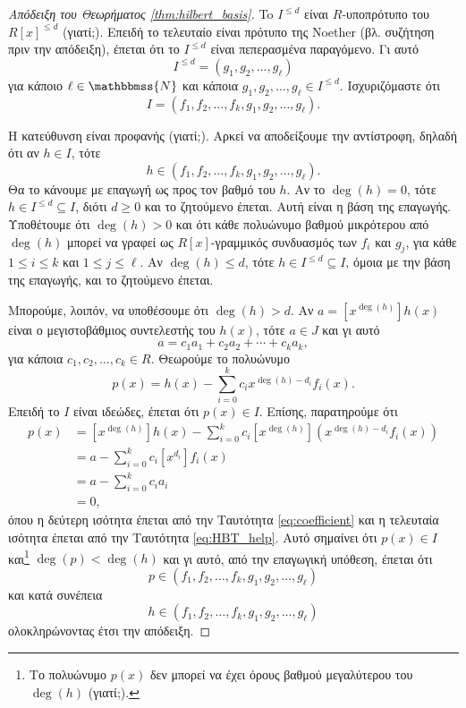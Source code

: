 \documentclass[12pt,a4paper,reqno]{amsart}
\theoremstyle{definition}
\theoremstyle{remark}
\numberwithin{theorem}{section}
\numberwithin{exercise}{section}
\numberwithin{equation}{section}
\newcommand{\NN}{\mathbbmss{N}}
\begin{document}
\begin{proof}[Απόδειξη του Θεωρήματος \ref{thm:hilbert_basis}]
    To $I^{\le d}$ είναι $R$-υποπρότυπο του $R[x]^{\le d}$ (γιατί;). Επειδή το τελευταίο είναι πρότυπο της Noether (βλ. συζήτηση πριν την απόδειξη), έπεται ότι το $I^{\le d}$ είναι πεπερασμένα παραγόμενο. Γι αυτό
    \[
    I^{\le d} = (g_1, g_2, \dots, g_\ell)
    \]
    για κάποιο $\ell \in \NN$ και κάποια $g_1, g_2, \dots, g_\ell \in I^{\le d}$. Ισχυριζόμαστε ότι 
    \[
    I = (f_1, f_2, \dots, f_k, g_1, g_2, \dots, g_\ell).
    \]

    Η κατεύθυνση \textquote{$\supseteq$} είναι προφανής (γιατί;). Αρκεί να αποδείξουμε την αντίστροφη, δηλαδή ότι αν $h \in I$, τότε 
    \[
    h \in (f_1, f_2, \dots, f_k, g_1, g_2, \dots, g_\ell).
    \]
    Θα το κάνουμε με επαγωγή ως προς τον βαθμό του $h$. Αν το $\deg(h) = 0$, τότε $h \in I^{\le{d}} \subseteq I$, διότι $d \ge 0$ και το ζητούμενο έπεται. Αυτή είναι η βάση της επαγωγής. Υποθέτουμε ότι $\deg(h) > 0$ και ότι κάθε πολυώνυμο βαθμού μικρότερου από $\deg(h)$ μπορεί να γραφεί ως $R[x]$-γραμμικός συνδυασμός των $f_i$ και $g_j$, για κάθε $1 \le i \le k$ και $1 \le j \le \ell$. Αν $\deg(h) \le d$, τότε $h \in I^{\le d} \subseteq I$, όμοια με την βάση της επαγωγής, και το ζητούμενο έπεται.

    Μπορούμε, λοιπόν, να υποθέσουμε ότι $\deg(h) > d$. Αν $a = [x^{\deg(h)}]h(x)$ είναι ο μεγιστοβάθμιος συντελεστής του $h(x)$, τότε $a \in J$ και γι αυτό 
    \begin{equation}
        \label{eq:HBT_help}
        a = c_1a_1 + c_2a_2 + \cdots + c_ka_k,
    \end{equation}
    για κάποια $c_1, c_2, \dots, c_k \in R$. Θεωρούμε το πολυώνυμο 
    \[
    p(x) = h(x) - \sum_{i=0}^k c_i x^{\deg(h) - d_i}f_i(x).
    \]
    Επειδή το $I$ είναι ιδεώδες, έπεται ότι $p(x) \in I$. Επίσης, παρατηρούμε ότι 
    \begin{align*}
    [x^{\deg(h)}]p(x) &= [x^{\deg(h)}]h(x) - \sum_{i=0}^{k} c_i [x^{\deg(h)}]\left(
        x^{\deg(h) - d_i}f_i(x)
    \right) \\
    &= a - \sum_{i=0}^{k} c_i [x^{d_i}]f_i(x) \\
    &= a - \sum_{i=0}^kc_ia_i \\
    &= 0,
    \end{align*}
    όπου η δεύτερη ισότητα έπεται από την Ταυτότητα \eqref{eq:coefficient} και η τελευταία ισότητα έπεται από την Ταυτότητα \eqref{eq:HBT_help}. Αυτό σημαίνει ότι $p(x) \in I$ και\footnote{Το πολυώνυμο $p(x)$ δεν μπορεί να έχει όρους βαθμού μεγαλύτερου του $\deg(h)$ (γιατί;).} $\deg(p) < \deg(h)$ και γι αυτό, από την επαγωγική υπόθεση, έπεται ότι 
    \[
    p \in (f_1, f_2, \dots, f_k, g_1, g_2, \dots, g_\ell)
    \]
    και κατά συνέπεια 
    \[
    h \in (f_1, f_2, \dots, f_k, g_1, g_2, \dots, g_\ell)
    \]
    ολοκληρώνοντας έτσι την απόδειξη.
\end{proof}
\end{document}
